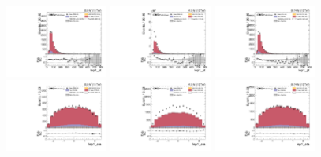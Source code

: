 \begin{figure}[!ht]
  \centering
  \includegraphics[width=0.30\textwidth]{analysis_plots/2016_zjj/cr_vjets_m/lep1_pt.pdf}
  \includegraphics[width=0.30\textwidth]{analysis_plots/2017_zjj/cr_vjets_m/lep1_pt.pdf}
  \includegraphics[width=0.30\textwidth]{analysis_plots/2018_zjj/cr_vjets_m/lep1_pt.pdf} \\
  \includegraphics[width=0.30\textwidth]{analysis_plots/2016_zjj/cr_vjets_m/lep1_eta.pdf}
  \includegraphics[width=0.30\textwidth]{analysis_plots/2017_zjj/cr_vjets_m/lep1_eta.pdf}
  \includegraphics[width=0.30\textwidth]{analysis_plots/2018_zjj/cr_vjets_m/lep1_eta.pdf} \\

\end{figure}
